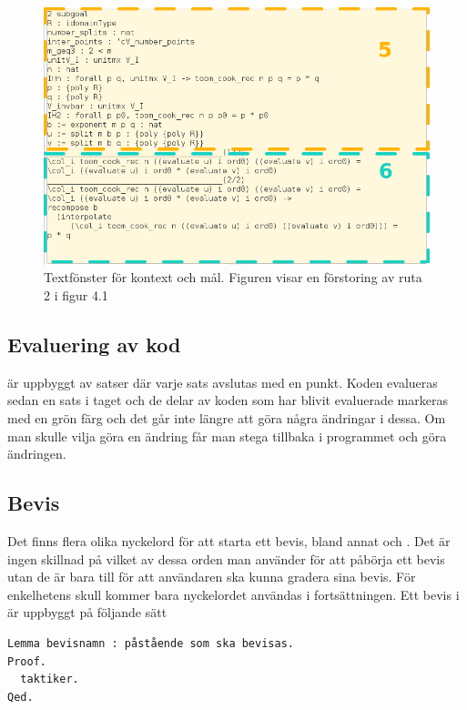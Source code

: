 \begin{figure}[H]
  \centering
  \includegraphics[width=150mm]{images/Kontext}
  \caption[Fönster för kontext och mål]
   {Textfönster för kontext och mål. Figuren visar en förstoring av ruta 2 i
    figur 4.1}
\end{figure}


\subsection{Evaluering av kod}
\coq är uppbyggt av satser där varje sats avslutas med en punkt. Koden
evalueras sedan en sats i taget och de delar av koden som har blivit evaluerade
markeras med en grön färg och det går inte längre att göra några ändringar i
dessa. Om man skulle vilja göra en ändring får man stega tillbaka
i programmet och göra ändringen.

\subsection{Bevis}
Det finns flera olika nyckelord för att starta ett bevis, bland annat
 och . Det är ingen skillnad på vilket av dessa orden man
använder för att påbörja ett bevis utan de är bara till för att användaren ska
kunna gradera sina bevis. För enkelhetens skull kommer bara nyckelordet
 användas i fortsättningen. Ett bevis i \coq är uppbyggt på följande
sätt

\begin{lstlisting}
Lemma bevisnamn : påstående som ska bevisas.
Proof.
  taktiker.
Qed.
\end{lstlisting}

